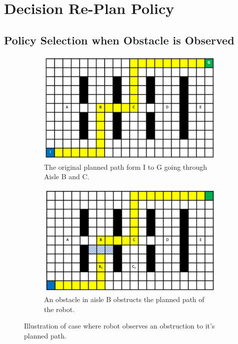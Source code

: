 \documentclass[a4paper,12pt]{article}
\begin{document}
	\pagebreak
	
	\tableofcontents
	
	\pagebreak
	
	\section{Decision Re-Plan Policy}
	\label{sec:decisionReplanPolicy}

		\subsection{Policy Selection when Obstacle is Observed}
		\label{sec:policySelectionWhenObstacleIsObserved}
		
			\begin{figure}[H]
				\centering
				\begin{subfigure}{.4\textwidth}
					\centering
					\includegraphics[width=\linewidth]{originalPlannedPath.png}
					\caption{The original planned path form I to G going through Aisle B and C.}
					\label{fig:originalPlannedPath}
				\end{subfigure}
				\begin{subfigure}{.4\textwidth}
					\centering
					\includegraphics[width=\linewidth]{blockedAisleB.png}
					\caption{An obstacle in aisle B obstructs the planned path of the robot.}
					\label{fig:blockedAisleB}
				\end{subfigure}
				\caption{Illustration of case where robot observes an obstruction to it's planned path.}
				\label{fig:task1_1Figures}
			\end{figure}
\end{document}
